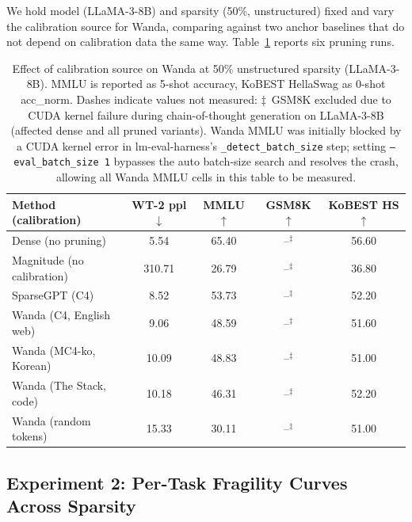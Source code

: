\documentclass{article}
\begin{document}
We hold model (LLaMA-3-8B) and sparsity (50\%, unstructured) fixed and vary
the calibration source for Wanda, comparing against two anchor baselines
that do not depend on calibration data the same way.
Table~\ref{tab:exp1-calib-domain} reports six pruning runs.

\begin{table}[h]
  \caption{Effect of calibration source on Wanda at 50\% unstructured
           sparsity (LLaMA-3-8B). MMLU is reported as 5-shot accuracy,
           KoBEST HellaSwag as 0-shot acc\_norm. Dashes indicate values
           not measured: $\ddagger$~GSM8K excluded due to CUDA kernel
           failure during chain-of-thought generation on LLaMA-3-8B
           (affected dense and all pruned variants).
           Wanda MMLU was initially blocked by a CUDA kernel error
           in lm-eval-harness's \texttt{\_detect\_batch\_size} step;
           setting \texttt{--eval\_batch\_size 1} bypasses the auto
           batch-size search and resolves the crash, allowing all Wanda
           MMLU cells in this table to be measured.}
  \label{tab:exp1-calib-domain}
  \centering
  \small
  \begin{tabular}{lcccc}
    \toprule
    Method (calibration) & WT-2 ppl $\downarrow$ & MMLU $\uparrow$ & GSM8K $\uparrow$ & KoBEST HS $\uparrow$ \\
    \midrule
    Dense (no pruning)         & 5.54     & 65.40               & --$^\ddagger$ & 56.60 \\
    \midrule
    Magnitude (no calibration) & 310.71   & 26.79               & --$^\ddagger$ & 36.80 \\
    SparseGPT (C4)             & 8.52     & 53.73               & --$^\ddagger$ & 52.20 \\
    \midrule
    Wanda (C4, English web)    & 9.06     & 48.59               & --$^\ddagger$ & 51.60 \\
    Wanda (MC4-ko, Korean)     & 10.09    & 48.83               & --$^\ddagger$ & 51.00 \\
    Wanda (The Stack, code)    & 10.18    & 46.31               & --$^\ddagger$ & 52.20 \\
    Wanda (random tokens)      & 15.33    & 30.11               & --$^\ddagger$ & 51.00 \\
    \bottomrule
  \end{tabular}
\end{table}

\subsection{Experiment 2: Per-Task Fragility Curves Across Sparsity}
\label{sec:exp2}
\end{document}
